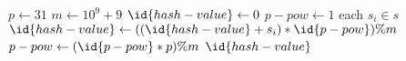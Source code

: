 \begin{codebox}
\li $p \gets 31$
\li $m \gets 10^9 + 9$
\li $\id{hash-value} \gets 0$
\li $p-pow \gets 1$
\For each $s_i \in s$ \Do
\li $\id{hash-value} \gets ((\id{hash-value} + s_i) * \id{p-pow}) \% m$
\li $p-pow \gets (\id{p-pow} * p) \% m$
\li \Return $\id{hash-value}$
\end{codebox}
